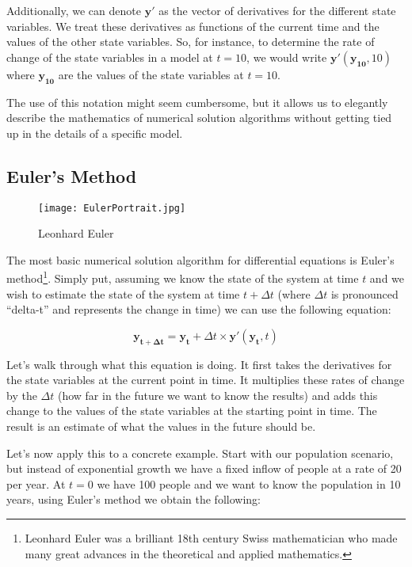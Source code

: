 \documentclass[]{memoir}
\let\Oldincludegraphics\includegraphics
\renewcommand{\includegraphics}[1]{\Oldincludegraphics[max size={\textwidth}{\textheight}]{#1}}
\begin{document}
Additionally, we can denote $\mathbf{y'}$ as the vector of derivatives
for the different state variables. We treat these derivatives as
functions of the current time and the values of the other state
variables. So, for instance, to determine the rate of change of the
state variables in a model at $t=10$, we would write
$\mathbf{y'}(\mathbf{y_{10}}, 10)$ where $\mathbf{y_{10}}$ are the
values of the state variables at $t=10$.

The use of this notation might seem cumbersome, but it allows us to
elegantly describe the mathematics of numerical solution algorithms
without getting tied up in the details of a specific model.

\subsection{Euler's Method}

\begin{figure}[htbp]
\centering
\texttt{[image: EulerPortrait.jpg]}
\caption{Leonhard Euler}
\end{figure}

The most basic numerical solution algorithm for differential equations
is Euler's method\footnote{Leonhard Euler was a brilliant 18th century
  Swiss mathematician who made many great advances in the theoretical
  and applied mathematics.}. Simply put, assuming we know the state of
the system at time $t$ and we wish to estimate the state of the system
at time $t+\Delta t$ (where $\Delta t$ is pronounced ``delta-t'' and
represents the change in time) we can use the following equation:

\[ \mathbf{y_{t+\Delta t}} = \mathbf{y_{t}} + \Delta t \times \mathbf{y'}(\mathbf{y_t}, t) \]

Let's walk through what this equation is doing. It first takes the
derivatives for the state variables at the current point in time. It
multiplies these rates of change by the $\Delta t$ (how far in the
future we want to know the results) and adds this change to the values
of the state variables at the starting point in time. The result is an
estimate of what the values in the future should be.

Let's now apply this to a concrete example. Start with our population
scenario, but instead of exponential growth we have a fixed inflow of
people at a rate of 20 per year. At $t=0$ we have 100 people and we want
to know the population in 10 years, using Euler's method we obtain the
following:
\end{document}
